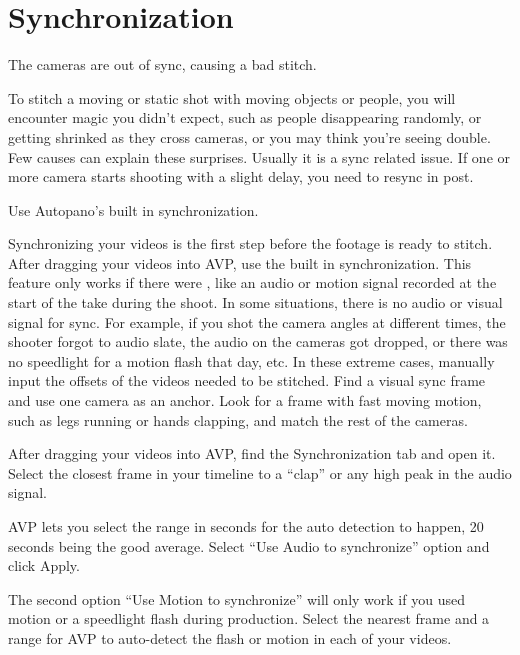 \section{Synchronization}
\pagecolor{white}
\label{chap:33}
\begin{fullwidth}

\problem

{\large The cameras are out of sync, causing a bad stitch. \par}

To stitch a moving or static shot with moving objects or people, you will encounter magic you didn’t expect, such as people disappearing randomly, or getting shrinked as they cross cameras, or you may think you’re seeing double. Few causes can explain these surprises. Usually it is a sync related issue. If one or more camera starts shooting with a slight delay, you need to resync in post.


\solutions

{\large Use Autopano’s built in synchronization. \par}

Synchronizing your videos is the first step before the footage is ready to stitch. After dragging your videos into AVP, use the built in synchronization. This feature only works if there were \textbf{}, like an audio or motion signal recorded at the start of the take during the shoot. In some situations, there is no audio or visual signal for sync. For example, if you shot the camera angles at different times, the shooter forgot to audio slate, the audio on the cameras got dropped, or there was no speedlight for a motion flash that day, etc. In these extreme cases, manually input the offsets of the videos needed to be stitched. Find a visual sync frame and use one camera as an anchor. Look for a frame with fast moving motion, such as legs running or hands clapping, and match the rest of the cameras.

After dragging your videos into AVP, find the Synchronization tab and open it. Select the closest frame in your timeline to a “clap” or any high peak in the audio signal. 

AVP lets you select the range in seconds for the auto detection to happen, 20 seconds being the good average. Select “Use Audio to synchronize” option and click Apply.


The second option “Use Motion to synchronize” will only work if you used motion or a speedlight flash during production. Select the nearest frame and a range for AVP to auto-detect the flash or motion in each of your videos.



\end{fullwidth}

